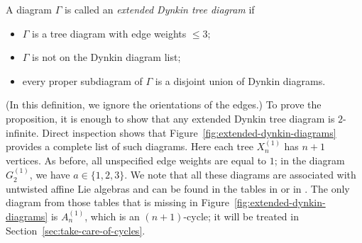 \documentclass[letterpaper]{amsart}
\numberwithin{equation}{section}
\theoremstyle{definition}
\def\proof{\smallskip\noindent {\bf Proof.\ }}
\begin{document}
\proof 
A diagram $\Gamma$ is called an \emph{extended Dynkin tree diagram} if 
\begin{itemize} 
\item 
$\Gamma$ is a tree diagram with edge weights $\leq 3$; 
\item 
$\Gamma$ is not on the Dynkin diagram list; 
\item 
every proper subdiagram of $\Gamma$ is a disjoint union of Dynkin diagrams. 
\end{itemize} 
(In this definition, we ignore the orientations of the edges.) 
To prove the proposition, it is enough to show that any extended 
Dynkin tree diagram is $2$-infinite. 
Direct inspection shows that Figure~\ref{fig:extended-dynkin-diagrams} 
provides a complete list of such diagrams. 
Here each tree $X_n^{(1)}$ has $n+1$ vertices. 
As before, all unspecified edge weights are equal to $1$; in the 
diagram~$G_2^{(1)}$, we have $a\in\{1,2,3\}$. 
We note that all these diagrams are associated with untwisted affine Lie algebras 
and can be found in the tables in \cite{bourbaki} or in 
\cite[Chapter 4, Table Aff~1]{kac}. 
The only diagram from those tables that is missing in 
Figure~\ref{fig:extended-dynkin-diagrams} is $A_n^{(1)}$, which is 
an $(n+1)$-cycle; it will be treated in Section~\ref{sec:take-care-of-cycles}. 
 
\end{document}
